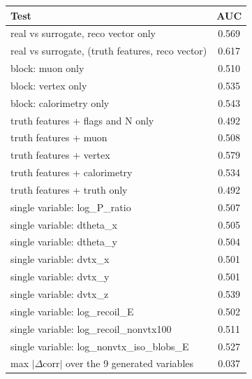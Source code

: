 \begin{tabular}{lc}
\toprule
Test & AUC \\
\midrule
real vs surrogate, reco vector only & 0.569 \\
real vs surrogate, (truth features, reco vector) & 0.617 \\
\midrule
block: muon only & 0.510 \\
block: vertex only & 0.535 \\
block: calorimetry only & 0.543 \\
truth features + flags and N only & 0.492 \\
truth features + muon & 0.508 \\
truth features + vertex & 0.579 \\
truth features + calorimetry & 0.534 \\
truth features + truth only & 0.492 \\
single variable: log\_P\_ratio & 0.507 \\
single variable: dtheta\_x & 0.505 \\
single variable: dtheta\_y & 0.504 \\
single variable: dvtx\_x & 0.501 \\
single variable: dvtx\_y & 0.501 \\
single variable: dvtx\_z & 0.539 \\
single variable: log\_recoil\_E & 0.502 \\
single variable: log\_recoil\_nonvtx100 & 0.511 \\
single variable: log\_nonvtx\_iso\_blobs\_E & 0.527 \\
\midrule
max $|\Delta$corr$|$ over the 9 generated variables & 0.037 \\
\bottomrule
\end{tabular}
